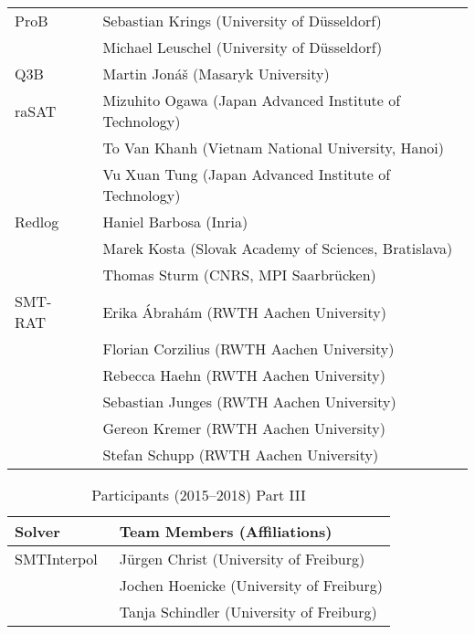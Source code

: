{\begin{table}
\begin{tabular}{ll}
      ProB~\cite{doi:10.1002/9781119002727.ch14}
      & Sebastian Krings (University of D\"usseldorf) \\
      & Michael Leuschel (University of D\"usseldorf)
      \\ \midrule

      Q3B
      & Martin Jon\'a\v{s} (Masaryk University)
      \\ \midrule

      raSAT~\cite{rasat}
      & Mizuhito Ogawa (Japan Advanced Institute of Technology) \\
      & To Van Khanh (Vietnam National University, Hanoi) \\
      & Vu Xuan Tung (Japan Advanced Institute of Technology)
      \\ \midrule

      Redlog~\cite{DBLP:journals/cca/Dolzmann097}
      & Haniel Barbosa (Inria) \\
      & Marek Kosta (Slovak Academy of Sciences, Bratislava)  \\
      & Thomas Sturm (CNRS, MPI Saarbr\"ucken)
      \\ \midrule

      SMT-RAT~\cite{DBLP:conf/sat/CorziliusKJSA15}
      & Erika \'Abrah\'am (RWTH Aachen University) \\
      & Florian Corzilius (RWTH Aachen University) \\
      & Rebecca Haehn (RWTH Aachen University) \\
      & Sebastian Junges (RWTH Aachen University) \\
      & Gereon Kremer (RWTH Aachen University) \\
      & Stefan Schupp (RWTH Aachen University)
      \\ \bottomrule
    \end{tabular}
  \end{table}

  \begin{table}
    \centering
    \caption{Participants (2015--2018) Part III}
    \label{table:participants3}
    \begin{tabular}{ll}
      \toprule
      Solver & Team Members (Affiliations)\\
      \midrule \midrule

      SMTInterpol~\cite{DBLP:conf/spin/ChristHN12}
      & J\"urgen Christ (University of Freiburg) \\
      & Jochen Hoenicke (University of Freiburg) \\
      & Tanja Schindler (University of Freiburg)
      \\ \midrule


\end{tabular}
\end{table}}
